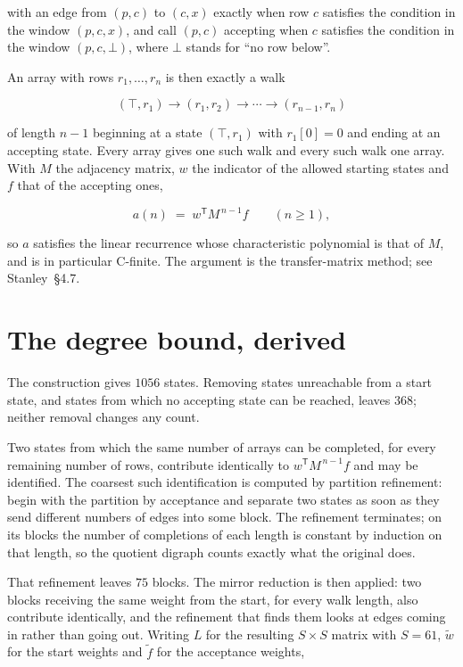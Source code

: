 \documentclass[11pt]{article}
\theoremstyle{definition}
\begin{document}
with an edge from $(p,c)$ to $(c,x)$ exactly when row $c$ satisfies the condition in the window $(p,c,x)$, and call $(p,c)$ accepting when $c$ satisfies the condition in the window $(p,c,\bot)$, where $\bot$ stands for ``no row below''.

An array with rows $r_1,\dots,r_n$ is then exactly a walk

\[(\top,r_1) \to (r_1,r_2) \to \cdots \to (r_{n-1},r_n)\]

of length $n-1$ beginning at a state $(\top,r_1)$ with $r_1[0]=0$ and ending at an accepting state. Every array gives one such walk and every such walk one array. With $M$ the adjacency matrix, $w$ the indicator of the allowed starting states and $f$ that of the accepting ones,

\[a(n) \;=\; w^{\mathsf T} M^{\,n-1} f \qquad (n \ge 1),\]

so $a$ satisfies the linear recurrence whose characteristic polynomial is that of $M$, and is in particular C-finite. The argument is the transfer-matrix method; see Stanley~\S4.7.

\section{The degree bound, derived}

The construction gives $1056$ states. Removing states unreachable from a start state, and states from which no accepting state can be reached, leaves $368$; neither removal changes any count.

Two states from which the same number of arrays can be completed, for every remaining number of rows, contribute identically to $w^{\mathsf T}M^{\,n-1}f$ and may be identified. The coarsest such identification is computed by partition refinement: begin with the partition by acceptance and separate two states as soon as they send different numbers of edges into some block. The refinement terminates; on its blocks the number of completions of each length is constant by induction on that length, so the quotient digraph counts exactly what the original does.

That refinement leaves $75$ blocks. The mirror reduction is then applied: two blocks receiving the same weight from the start, for every walk length, also contribute identically, and the refinement that finds them looks at edges coming in rather than going out. Writing $L$ for the resulting $S \times S$ matrix with $S = 61$, $\tilde w$ for the start weights and $\tilde f$ for the acceptance weights,
\end{document}
